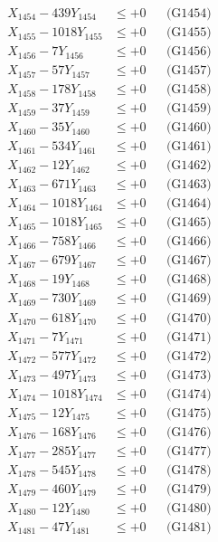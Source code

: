 \documentclass[a4paper,10pt]{article}
\begin{document}
{\begin{align}
X_{1454} - 439Y_{1454} &\leq +0 && \text{(G1454)} \\
X_{1455} - 1018Y_{1455} &\leq +0 && \text{(G1455)} \\
X_{1456} - 7Y_{1456} &\leq +0 && \text{(G1456)} \\
X_{1457} - 57Y_{1457} &\leq +0 && \text{(G1457)} \\
X_{1458} - 178Y_{1458} &\leq +0 && \text{(G1458)} \\
X_{1459} - 37Y_{1459} &\leq +0 && \text{(G1459)} \\
X_{1460} - 35Y_{1460} &\leq +0 && \text{(G1460)} \\
\allowbreak
X_{1461} - 534Y_{1461} &\leq +0 && \text{(G1461)} \\
X_{1462} - 12Y_{1462} &\leq +0 && \text{(G1462)} \\
X_{1463} - 671Y_{1463} &\leq +0 && \text{(G1463)} \\
X_{1464} - 1018Y_{1464} &\leq +0 && \text{(G1464)} \\
X_{1465} - 1018Y_{1465} &\leq +0 && \text{(G1465)} \\
X_{1466} - 758Y_{1466} &\leq +0 && \text{(G1466)} \\
X_{1467} - 679Y_{1467} &\leq +0 && \text{(G1467)} \\
X_{1468} - 19Y_{1468} &\leq +0 && \text{(G1468)} \\
X_{1469} - 730Y_{1469} &\leq +0 && \text{(G1469)} \\
X_{1470} - 618Y_{1470} &\leq +0 && \text{(G1470)} \\
\allowbreak
X_{1471} - 7Y_{1471} &\leq +0 && \text{(G1471)} \\
X_{1472} - 577Y_{1472} &\leq +0 && \text{(G1472)} \\
X_{1473} - 497Y_{1473} &\leq +0 && \text{(G1473)} \\
X_{1474} - 1018Y_{1474} &\leq +0 && \text{(G1474)} \\
X_{1475} - 12Y_{1475} &\leq +0 && \text{(G1475)} \\
X_{1476} - 168Y_{1476} &\leq +0 && \text{(G1476)} \\
X_{1477} - 285Y_{1477} &\leq +0 && \text{(G1477)} \\
X_{1478} - 545Y_{1478} &\leq +0 && \text{(G1478)} \\
X_{1479} - 460Y_{1479} &\leq +0 && \text{(G1479)} \\
X_{1480} - 12Y_{1480} &\leq +0 && \text{(G1480)} \\
\allowbreak
X_{1481} - 47Y_{1481} &\leq +0 && \text{(G1481)} \\

\end{align}}
\end{document}
